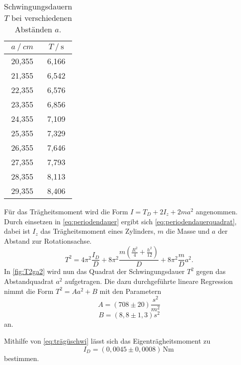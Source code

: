 \begin{table}[H] %
  \centering
  \begin{tabular}{S[table-format=2.3] S[table-format=2.2]}
      \toprule
      {$a \mathbin{/}\unit{cm}$} & {$T \mathbin{/} \unit{\second}$}\\
      ,355 & 6,166 \\
           21,355 & 6,542 \\
           22,355 & 6,576 \\
           23,355 & 6,856 \\  
           24,355 & 7,109 \\
           25,355 & 7,329 \\
           26,355 & 7,646 \\
           27,355 & 7,793 \\
           28,355 & 8,113 \\
           29,355 & 8,406 \\
      \bottomrule
  \end{tabular}
  \caption{Schwingungsdauern $T$ bei verschiedenen Abständen $a$.}
  \label{tab:Messung_b}
\end{table}
Für das Trägheitsmoment wird die Form $ I = T_D + 2I_z + 2m a^2$ angenommen. 
Durch einsetzen in \eqref{eq:periodendauer} ergibt sich \eqref{eq:periodendauerquadrat}, dabei ist $I_z$ das Trägheitsmoment eines Zylinders, $m$ die Masse und $a$ der Abstand zur Rotationsachse.
\begin{equation}
  T^2 = 4 \pi^2 \frac{I_D}{D} + 8 \pi^2 \frac{m (\frac{R^2}{4} + \frac{h^2}{12})}{D}+ 8 \pi^2 \frac{m}{D} a^2 .
  \label{eq:periodendauerquadrat}
\end{equation}
In \autoref{fig:T2ga2} wird nun das Quadrat der Schwingungsdauer $T^2$ gegen das Abstandquadrat $a^2$ aufgetragen.
Die dazu durchgeführte lineare Regression nimmt die Form $T^2 = A  a^2 + B $ mit den Parametern
\begin{equation*}
  A = (708 \pm 20) \dfrac{s^2}{m^2}
\end{equation*}
\begin{equation*}
 B = (8,8 \pm 1,3) s^2
\end{equation*}
an.

Mithilfe von \eqref{eq:trägüschwi} lässt sich das Eigenträgheitsmoment zu
\begin{equation*}
  I_D = (0,0045 \pm 0,0008) \,\unit{\newton\meter} \,
\end{equation*}
bestimmen.

